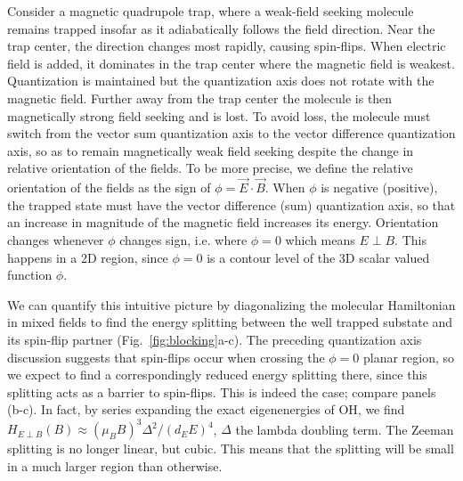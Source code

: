 \documentclass[%
 reprint,
 amsmath,amssymb,
 aps,
prl,
]{revtex4-1}
\newcommand{\epb}{{$E\!\perp\!B$}}
\newcommand{\epbm}{{E\!\perp\!B}}
\begin{document}

Consider a magnetic quadrupole trap, where a weak-field seeking molecule remains trapped insofar as it adiabatically follows the field direction. Near the trap center, the direction changes most rapidly, causing spin-flips. When electric field is added, it dominates in the trap center where the magnetic field is weakest. Quantization is maintained but the quantization axis does not rotate with the magnetic field. Further away from the trap center the molecule is then magnetically strong field seeking and is lost. To avoid loss, the molecule must switch from the vector sum quantization axis to the vector difference quantization axis, so as to remain magnetically weak field seeking despite the change in relative orientation of the fields. To be more precise, we define the relative orientation of the fields as the sign of $\phi=\vec{E}\cdot\vec{B}$. When $\phi$ is negative (positive), the trapped state must have the vector difference (sum) quantization axis, so that an increase in magnitude of the magnetic field increases its energy. Orientation changes whenever $\phi$ changes sign, i.e. where $\phi=0$ which means \epb. This happens in a 2D region, since $\phi=0$ is a contour level of the 3D scalar valued function $\phi$. 


We can quantify this intuitive picture by diagonalizing the molecular Hamiltonian in mixed fields to find the energy splitting between the well trapped substate and its spin-flip partner (Fig.~\ref{fig:blocking}a-c). The preceding quantization axis discussion suggests that spin-flips occur when crossing the $\phi=0$ planar region, so we expect to find a correspondingly reduced energy splitting there, since this splitting acts as a barrier to spin-flips. This is indeed the case; compare panels (b-c). In fact, by series expanding the exact eigenenergies of OH, we find $H_\epbm(B)\approx (\mu_BB)^3\Delta^2/(d_EE)^4$, $\Delta$ the lambda doubling term. The Zeeman splitting is no longer linear, but cubic. This means that the splitting will be small in a much larger region than otherwise.

\end{document}
